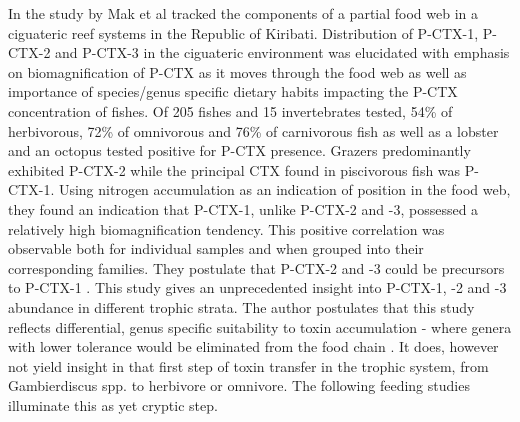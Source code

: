 \documentclass[12pt]{article}
\begin{document}
In the study by Mak et al tracked the components of a partial food web in a ciguateric reef systems in the Republic of Kiribati. Distribution of P-CTX-1, P-CTX-2 and P-CTX-3 in the ciguateric environment was elucidated with emphasis on biomagnification of P-CTX as it moves through the food web as well as importance of species/genus specific dietary habits impacting the P-CTX concentration of fishes. Of 205 fishes and 15 invertebrates tested, 54\% of herbivorous, 72\% of omnivorous and 76\% of carnivorous fish as well as a lobster and an octopus tested positive for P-CTX presence\cite{mak2013pacific}. Grazers predominantly exhibited P-CTX-2 while the principal CTX found in piscivorous fish was P-CTX-1. Using nitrogen accumulation as an indication of position in the food web, they found an indication that P-CTX-1, unlike P-CTX-2 and -3, possessed a relatively high biomagnification tendency. This positive correlation was observable both for individual samples and when grouped into their corresponding families. They postulate that P-CTX-2 and -3 could be precursors to P-CTX-1 \cite{mak2013pacific}. This study gives an unprecedented insight into P-CTX-1, -2 and -3 abundance in different trophic strata. The author postulates that this study reflects differential, genus specific suitability to toxin accumulation - where genera with lower tolerance would be eliminated from the food chain \cite{makICHA}. It does, however not yield insight in that first step of toxin transfer in the trophic system, from Gambierdiscus spp. to herbivore or omnivore. The following feeding studies illuminate this as yet cryptic step. 
\end{document}
